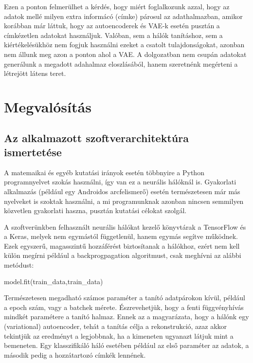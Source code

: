 \documentclass[12pt]{article}
\begin{document}
Ezen a ponton felmerülhet a kérdés, hogy miért foglalkozunk azzal, hogy az adatok mellé milyen extra informácó (címke) párosul az adathalmazban, amikor korábban már láttuk, hogy az autoencoderek és VAE-k esetén pusztán a címkézetlen adatokat használjuk. Valóban, sem a hálók tanításhoz, sem a kiértékelésükhöz nem fogjuk használni ezeket a csatolt tulajdonságokat, azonban nem állunk meg azon a ponton ahol a VAE. A dolgozatban nem csupán adatokat generálunk a megadott adahalmaz eloszlásából, hanem szeretnénk megérteni a létrejött látens teret.

\section{Megvalósítás}

\subsection{Az alkalmazott szoftverarchitektúra ismertetése}

A matemaikai és egyéb kutatási irányok esetén többnyire a Python programnyelvet szokás használni, így van ez a neurális hálóknál is. Gyakorlati alkalmazás (például egy Androidos arcfelismerő) esetén természetesen már más nyelveket is szoktak használni, a mi programunknak azonban nincsen semmilyen közvetlen gyakorlati haszna, pusztán kutatási célokat szolgál.

A szoftverünkben felhasznált neurális hálókat kezelő könyvtárak a TensorFlow és a Keras, melyek nem egymástól függetlenül, hanem egymás segítve működnek. Ezek egyszerű, magasszintű hozzáférést biztosítanak a hálókhoz, ezért nem kell külön megírni például a backprogpagation algoritmust, csak meghívni az alábbi metódust:

\begin{python}
model.fit(train_data,train_data)
\end{python}

Természetesen megadható számos paraméter a tanító adatpárokon kívül, például a epoch szám, vagy a batchek mérete. Észrevehetjük, hogy a fenti függvényhívás mindkét paramétere a tanító halmaz. Ennek az a magyarázata, hogy a hálónk egy (variational) autoencoder, tehát a tanítás célja a rekonstrukció, azaz akkor tekintjük az eredményt a legjobbnak, ha a kimeneten ugyanazt látjuk mint a bemeneten. Egy klasszifikáló háló esetében például az első paraméter az adatok, a második pedig a hozzátartozó címkék lennének.
\end{document}
